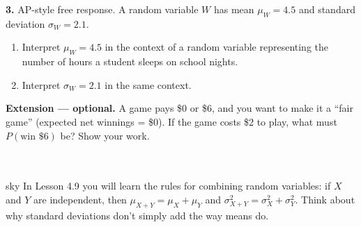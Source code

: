 \documentclass[10pt]{article}
\begin{document}
\begin{practicebox}
\tcbbreak
\vspace{0.14in}

\textbf{3.} AP-style free response. A random variable $W$ has mean $\mu_W = 4.5$ and
standard deviation $\sigma_W = 2.1$.
\begin{enumerate}[label=(\alph*), leftmargin=2em, itemsep=8pt]
  \item Interpret $\mu_W = 4.5$ in the context of a random variable representing the
        number of hours a student sleeps on school nights.\\

  \item Interpret $\sigma_W = 2.1$ in the same context.\\
\end{enumerate}

\end{practicebox}

\vspace{0.1in}

\begin{extensionbox}
\small
\textbf{Extension --- optional.}
A game pays \$0 or \$6, and you want to make it a ``fair game'' (expected net winnings = \$0).
If the game costs \$2 to play, what must $P(\text{win \$6})$ be?
Show your work.\\[4pt]
\writeline\\[1pt]\writeline\\[1pt]\writeline
\end{extensionbox}

\vspace{0.1in}

\begin{blurbbox}{sky}
\small
In Lesson 4.9 you will learn the rules for combining random variables: if $X$ and $Y$ are
independent, then $\mu_{X+Y} = \mu_X + \mu_Y$ and $\sigma^2_{X+Y} = \sigma^2_X + \sigma^2_Y$.
Think about why standard deviations don't simply add the way means do.
\end{blurbbox}
\end{document}
